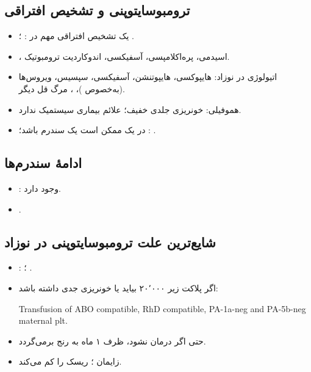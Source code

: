 \documentclass[12pt,a4paper]{article}
\begin{document}
\subsection*{ترومبوسایتوپنی و تشخیص افتراقی}
\begin{itemize}
\item یک تشخیص افتراقی مهم در :
؛ .
\item {}، اسیدمی، پره‌اکلامپسی، آسفیکسی، اندوکاردیت ترومبوتیک.
\item اتیولوژی  در نوزاد: هایپوکسی، هایپوتنشن، آسفیکسی، سپسیس،
ویروس‌ها (به‌خصوص )، ، مرگ قل دیگر.
\item هموفیلی: خونریزی جلدی خفیف؛ علائم بیماری سیستمیک ندارد.
\item[\AHmath{\ast}]  در یک  ممکن است یک سندرم باشد؛
: .
\end{itemize}

\subsection*{ادامهٔ سندرم‌ها}
\begin{itemize}
\item {}:  وجود دارد.
\item {}.
\end{itemize}
\subsection*{شایع‌ترین علت ترومبوسایتوپنی در نوزاد }
\begin{itemize}
\item {}:
؛ .
\item اگر پلاکت زیر ۲۰٬۰۰۰ بیاید یا خونریزی جدی داشته باشد:
\begin{latin}
Transfusion of ABO compatible, RhD compatible, PA-1a-neg
and PA-5b-neg maternal plt.
\end{latin}
\item حتی اگر درمان نشود، ظرف ۱ ماه  به رنج  برمی‌گردد.
\item زایمان ؛ ریسک  را کم می‌کند.
\end{itemize}
\end{document}
